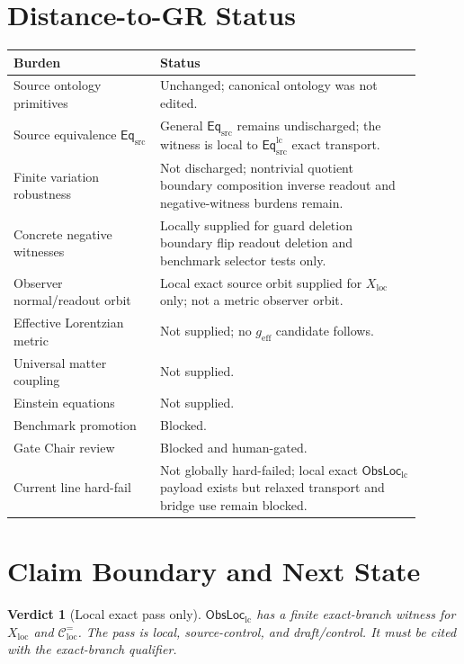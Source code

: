 \documentclass[11pt]{article}
\newcommand{\EqSrc}{\mathsf{Eq}_{\mathrm{src}}}
\newcommand{\EqLC}{\mathsf{Eq}_{\mathrm{src}}^{\mathrm{lc}}}
\newcommand{\ObsLocLC}{\mathsf{ObsLoc}_{\mathrm{lc}}}
\newcommand{\geff}{g_{\mathrm{eff}}}
\newtheorem{verdict}{Verdict}
\begin{document}
\section{Distance-to-GR Status}

\begin{center}
\small
\begin{tabular}{p{0.32\linewidth}p{0.58\linewidth}}
\hline
Burden & Status \\
\hline
Source ontology primitives & Unchanged; canonical ontology was not edited. \\
Source equivalence \(\EqSrc\) & General \(\EqSrc\) remains undischarged; the witness is local to \(\EqLC\) exact transport. \\
Finite variation robustness & Not discharged; nontrivial quotient boundary composition inverse readout and negative-witness burdens remain. \\
Concrete negative witnesses & Locally supplied for guard deletion boundary flip readout deletion and benchmark selector tests only. \\
Observer normal/readout orbit & Local exact source orbit supplied for \(X_{\mathrm{loc}}\) only; not a metric observer orbit. \\
Effective Lorentzian metric & Not supplied; no \(\geff\) candidate follows. \\
Universal matter coupling & Not supplied. \\
Einstein equations & Not supplied. \\
Benchmark promotion & Blocked. \\
Gate Chair review & Blocked and human-gated. \\
Current line hard-fail & Not globally hard-failed; local exact \(\ObsLocLC\) payload exists but relaxed transport and bridge use remain blocked. \\
\hline
\end{tabular}
\end{center}

\section{Claim Boundary and Next State}

\begin{verdict}[Local exact pass only]
\(\ObsLocLC\) has a finite exact-branch witness for
\(X_{\mathrm{loc}}\) and \(\mathcal{C}^{=}_{\mathrm{loc}}\). The
pass is local, source-control, and draft/control. It must be cited
with the exact-branch qualifier.
\end{verdict}
\end{document}
